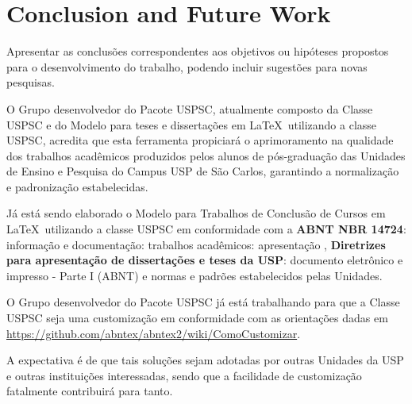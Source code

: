 \chapter{Conclusion and Future Work}
Apresentar as conclusões correspondentes aos objetivos ou hipóteses propostos para o desenvolvimento do trabalho, podendo incluir  sugestões para novas pesquisas.

O Grupo desenvolvedor do Pacote USPSC, atualmente composto da Classe USPSC e do  Modelo para teses e dissertações em \LaTeX\ utilizando a classe USPSC, acredita que esta ferramenta propiciará o aprimoramento na qualidade dos trabalhos acadêmicos produzidos pelos alunos de pós-graduação das Unidades de Ensino e Pesquisa do Campus USP de São Carlos, garantindo a normalização e padronização estabelecidas.

Já está sendo elaborado o Modelo para Trabalhos de Conclusão de Cursos em \LaTeX\ utilizando a classe USPSC em conformidade com  a \textbf{ABNT NBR 14724}: informação e documentação: trabalhos acadêmicos: apresentação \cite{nbr14724}, \textbf{Diretrizes para apresentação de dissertações e teses da USP}: documento eletrônico e impresso - Parte I (ABNT) \cite{sibi2009} e normas e padrões estabelecidos pelas Unidades.

O Grupo desenvolvedor do Pacote USPSC já está trabalhando para que a Classe USPSC seja uma  customização em conformidade com as orientações dadas em \url{https://github.com/abntex/abntex2/wiki/ComoCustomizar}.

A expectativa é de que tais soluções sejam adotadas por outras Unidades da USP e outras instituições interessadas, sendo que a facilidade de customização fatalmente contribuirá para tanto.




